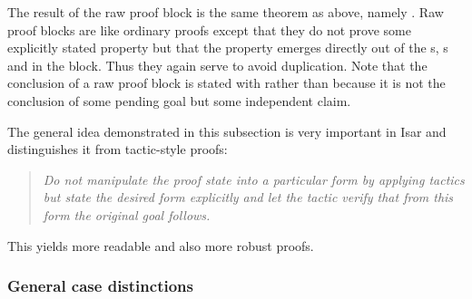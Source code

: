 \begin{isabellebody}
%
\isadelimproof
%
\endisadelimproof
%
\begin{isamarkuptext}%
\noindent The result of the raw proof block is the same theorem
as above, namely .  Raw
proof blocks are like ordinary proofs except that they do not prove
some explicitly stated property but that the property emerges directly
out of the s, s and
 in the block. Thus they again serve to avoid
duplication. Note that the conclusion of a raw proof block is stated with
 rather than  because it is not the
conclusion of some pending goal but some independent claim.

The general idea demonstrated in this subsection is very
important in Isar and distinguishes it from tactic-style proofs:
\begin{quote}\em
Do not manipulate the proof state into a particular form by applying
tactics but state the desired form explicitly and let the tactic verify
that from this form the original goal follows.
\end{quote}
This yields more readable and also more robust proofs.

\subsubsection{General case distinctions}


\end{isamarkuptext}
\end{isabellebody}
